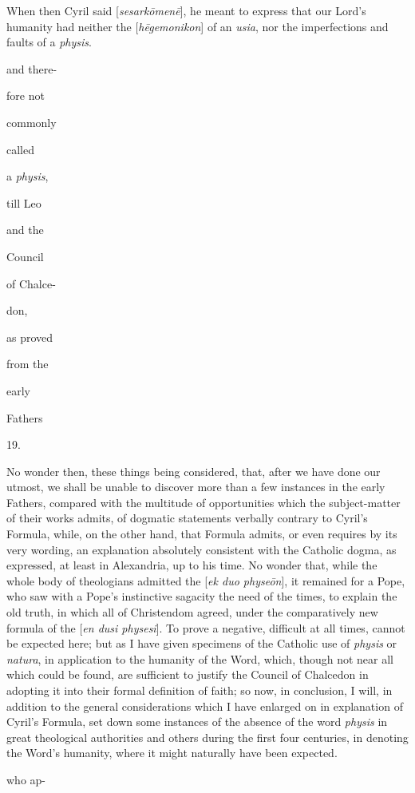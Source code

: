 When then Cyril said
[\emph{sesark\={o}men\={e}}], he meant to express that
our Lord's humanity had neither the [\emph{h\={e}gemonikon}]
of an \emph{usia}, nor the imperfections and faults of a \emph{physis}.

and there-

fore not

commonly

called

a \emph{physis},

till Leo

and the

Council

of Chalce-

don,

as proved

from the

early

Fathers

19.

No wonder then, these things being
considered, that, after we have done our utmost, we shall be
unable to discover more than a few instances in the early
Fathers, compared with the multitude of opportunities which
the subject-matter of their works admits, of dogmatic
statements verbally contrary to Cyril's Formula, while, on the
other hand, that Formula admits, or even requires by its very wording, an explanation absolutely consistent with the
Catholic dogma, as expressed, at least in Alexandria, up to
his time. No wonder that, while the whole body of theologians
admitted the [\emph{ek duo physe\={o}n}], it remained for a
Pope, who saw with a Pope's instinctive sagacity the need of
the times, to explain the old truth, in which all of
Christendom agreed, under the comparatively new formula of the
[\emph{en dusi physesi}]. To prove a negative, difficult at
all times, cannot be expected here; but as I have given
specimens of the Catholic use of \emph{physis} or \emph{natura},
in application to the humanity of the Word, which, though not
near all which could be found, are sufficient to justify the
Council of Chalcedon in adopting it into their formal
definition of faith; so now, in conclusion, I will, in
addition to the general considerations which I have enlarged
on in explanation of Cyril's Formula, set down some instances
of the absence of the word \emph{physis} in great theological
authorities and others during the first four
centuries, in denoting the Word's humanity, where it might
naturally have been expected.

who ap-

